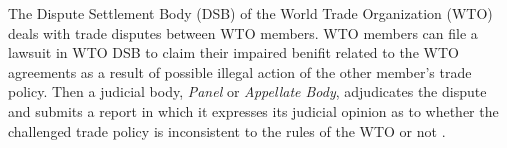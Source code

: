 The Dispute Settlement Body (DSB) of 
the World Trade Organization (WTO) deals 
with trade disputes between WTO members.
WTO members can file a lawsuit in WTO DSB to 
claim their impaired benifit related to the WTO agreements as a result of possible illegal action of the other member's trade policy.
Then a judicial body, \textit{Panel} or \textit{Appellate Body}, %
adjudicates the dispute and submits a report in which it expresses
its judicial opinion as to whether the challenged 
trade policy is inconsistent to the rules of the WTO or not \citep{world2017handbook}.

 

